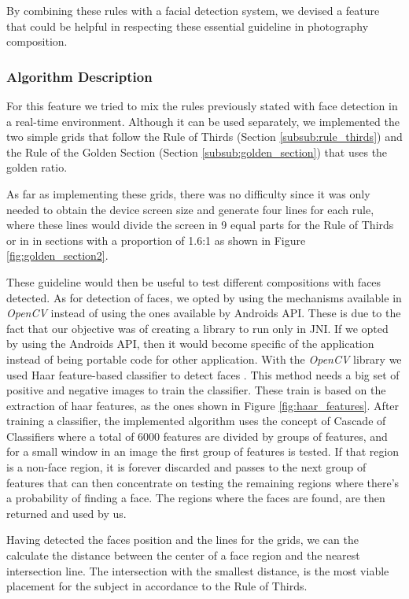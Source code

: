 By combining these rules with a facial detection system, we devised a feature that could be helpful in respecting these essential guideline in photography composition.

\subsubsection{Algorithm Description}

For this feature we tried to mix the rules previously stated with face detection in a real-time environment. Although it can be used separately, we implemented the two simple grids that follow the Rule of Thirds (Section \ref{subsub:rule_thirds}) and the Rule of the Golden Section (Section \ref{subsub:golden_section}) that uses the golden ratio.

As far as implementing these grids, there was no difficulty since it was only needed to obtain the device screen size and generate four lines for each rule, where these lines would divide the screen in 9 equal parts for the Rule of Thirds or in in sections with a proportion of 1.6:1 as shown in Figure \ref{fig:golden_section2}.

These guideline would then be useful to test different compositions with faces detected. As for detection of faces, we opted by using the mechanisms available in \emph{OpenCV} instead of using the ones available by Androids API. These is due to the fact that our objective was of creating a library to run only in JNI. If we opted by using the Androids API, then it would become specific of the application instead of being portable code for other application.
With the \emph{OpenCV} library we used Haar feature-based classifier to detect faces \cite{viola2001rapid}. This method needs a big set of positive and negative images to train the classifier. These train is based on the extraction of haar features, as the ones shown in Figure \ref{fig:haar_features}. After training a classifier, the implemented algorithm uses the concept of Cascade of Classifiers where a total of 6000 features are divided by groups of features, and for a small window in an image the first group of features is tested. If that region is a non-face region, it is forever discarded and passes to the next group of features that can then concentrate on testing the remaining regions where there's a probability of finding a face. The regions where the faces are found, are then returned and used by us.

Having detected the faces position and the lines for the grids, we can the calculate the distance between the center of a face region and the nearest intersection line. The intersection with the smallest distance, is the most viable placement for the subject in accordance to the Rule of Thirds.


